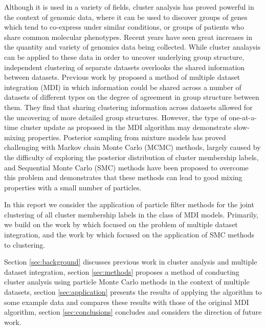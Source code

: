 \documentclass[10pt,a4paper]{article}
\begin{document}
Although it is used in a variety of fields, cluster analysis has proved powerful in the context of genomic data, where it can be used to discover groups of genes which tend to co-express under similar conditions, or groups of patients who share common molecular phenotypes. Recent years have seen great increases in the quantity and variety of genomics data being collected. While cluster analaysis can be applied to these data in order to uncover underlying group structure, independent clustering of separate datasets overlooks the shared information between datasets. Previous work by \citeauthor{kirk2012bayesian} \cite{kirk2012bayesian} proposed a method of multiple dataset integration (MDI) in which information could be shared across a number of datasets of different types on the degree of agreement in group structure between them. They find that sharing clustering information across datasets allowed for the uncovering of more detailed group structures. However, the type of one-at-a-time cluster update as proposed in the MDI algorithm may demonstrate slow-mixing properties.  Posterior sampling from mixture models has proved challenging with Markov chain Monte Carlo (MCMC) methods, largely caused by the difficulty of exploring the posterior distribution of cluster membership labels, and Sequential Monte Carlo (SMC) methods \cite{andrieu2010particle} have been proposed to overcome this problem and \citeauthor{griffin2014sequential}\cite{griffin2014sequential} demonstrates that these methods can lead to good mixing properties with a small number of particles. 

In this report we consider the application of particle filter methods for the joint clustering of all cluster membership labels in the class of MDI models. Primarily, we build on the work by \citeauthor{kirk2012bayesian} \cite{kirk2012bayesian} which focused on the problem of multiple dataset integration, and the work by \citeauthor{griffin2014sequential}\cite{griffin2014sequential} which focused on the application of SMC methods to clustering.


Section \ref{sec:background} discusses previous work in cluster analysis and multiple dataset integration, section \ref{sec:methods} proposes a method of conducting cluster analysis using particle Monte Carlo methods in the context of multiple datasets, section \ref{sec:application} presents the results of applying the algorithm to some example data and compares these results with those of the original MDI algorithm, section \ref{sec:conclusions} concludes and considers the direction of future work.
\end{document}
